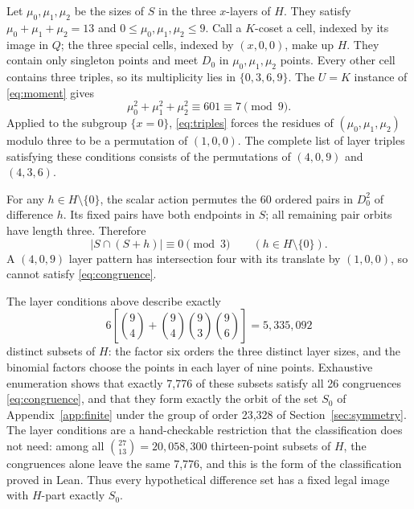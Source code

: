 \documentclass[11pt]{article}
\begin{document}
Let $\mu_0,\mu_1,\mu_2$ be the sizes of $S$ in the three $x$-layers of $H$.
They satisfy $\mu_0+\mu_1+\mu_2=13$ and $0\leq\mu_0,\mu_1,\mu_2\leq9$.
Call a $K$-coset a cell, indexed by its image in $Q$; the three
special cells, indexed by $(x,0,0)$, make up $H$. They contain only
singleton points and meet $D_0$ in $\mu_0,\mu_1,\mu_2$ points. Every other
cell contains three triples, so its multiplicity lies
in $\{0,3,6,9\}$. The $U=K$ instance of
\eqref{eq:moment} gives
\[
 \mu_0^2+\mu_1^2+\mu_2^2\equiv601\equiv7\pmod9.
\]
Applied to the subgroup $\{x=0\}$, \eqref{eq:triples} forces the
residues of $(\mu_0,\mu_1,\mu_2)$ modulo three to be a permutation of $(1,0,0)$.
The complete list of layer triples satisfying these conditions
consists of the permutations of $(4,0,9)$ and $(4,3,6)$.

For any $h\in H\setminus\{0\}$, the scalar action permutes the
60 ordered pairs in $D_0^2$ of difference $h$. Its fixed pairs
have both endpoints in $S$; all remaining pair orbits have
length three. Therefore
\begin{equation}\label{eq:congruence}
 |S\cap(S+h)|\equiv0\pmod3
 \qquad(h\in H\setminus\{0\}).
\end{equation}
A $(4,0,9)$ layer pattern has intersection four with its
translate by $(1,0,0)$, so cannot satisfy \eqref{eq:congruence}.

The layer conditions above describe exactly
\begin{equation}\label{eq:maskcount}
 6\left[\binom94+\binom94\binom93\binom96\right]
 =5{,}335{,}092
\end{equation}
distinct subsets of $H$: the factor six orders the three distinct layer
sizes, and the binomial factors choose the points in each layer of nine
points. Exhaustive enumeration shows that exactly 7,776 of these
subsets satisfy all 26 congruences \eqref{eq:congruence}, and that they
form exactly the orbit of the set $S_0$ of Appendix~\ref{app:finite}
under the group of order 23,328 of Section~\ref{sec:symmetry}. The layer
conditions are a hand-checkable restriction that the classification
does not need: among all $\binom{27}{13}=20{,}058{,}300$ thirteen-point
subsets of $H$, the congruences alone leave the same 7,776, and this is
the form of the classification proved in Lean. Thus every hypothetical
difference set has a fixed legal image with $H$-part exactly $S_0$.
\end{document}
